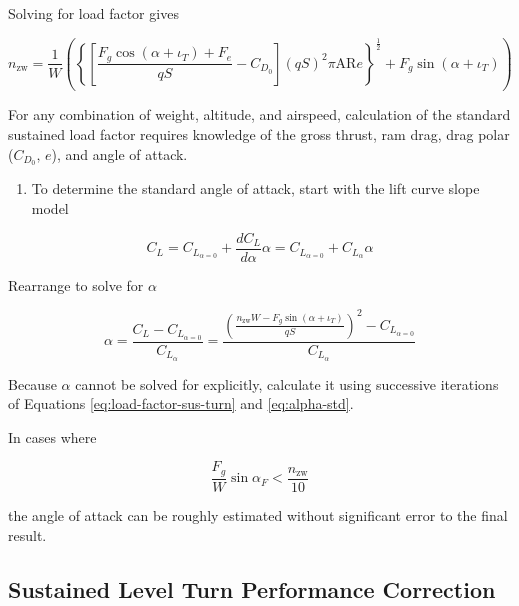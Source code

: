 \documentclass[
]{book}
\providecommand{\tightlist}{%
  \setlength{\itemsep}{0pt}\setlength{\parskip}{0pt}}
\begin{document}
Solving for load factor gives

\[
n_{\text{zw}} = \frac{1}{W}
      \left(
            \left\{
                  \left[
                        \frac{F_g \cos \left(\alpha + \iota_T \right)+F_e}
                             {qS} -
                        C_{D_0}
                  \right]
                  \left(
                        qS
                  \right)^2
                  \pi \mathrm{AR} e
            \right\}^{\frac{1}{2}} +
            F_g \sin \left(\alpha + \iota_T \right)
      \right)
\label{eq:load-factor-sus-turn}
\]

For any combination of weight, altitude, and airspeed, calculation of the
standard sustained load factor requires knowledge of the gross thrust, ram
drag, drag polar (\(C_{D_0},\,e\)), and angle of attack.

\begin{enumerate}
\def\labelenumi{\arabic{enumi}.}
\setcounter{enumi}{5}
\tightlist
\item
  To determine the standard angle of attack, start with the lift curve slope
  model
\end{enumerate}

\[
C_L = C_{L_{\alpha = 0}} + \frac{dC_L}{d\alpha} \alpha = C_{L_{\alpha = 0}} + C_{L_{\alpha}}\alpha
\]

Rearrange to solve for \(\alpha\)

\[
\alpha = \frac{C_L - C_{L_{\alpha = 0}}}{C_{L_{\alpha}}} =
      \frac{\left(
                  \frac{n_{\text{zw}}W - F_g \sin \left(\alpha + \iota_T \right)}
                       {qS}
            \right)^2 - C_{L_{\alpha = 0}}}
           {C_{L_{\alpha}}}
\label{eq:alpha-std}
\]

Because \(\alpha\) cannot be solved for explicitly, calculate it using
successive iterations of Equations \eqref{eq:load-factor-sus-turn} and \eqref{eq:alpha-std}.

In cases where

\[
\frac{F_g}{W} \sin \alpha_F \lt \frac{n_{\text{zw}}}{10}
\]

the angle of attack can be roughly estimated without significant error to the
final result.

\hypertarget{sustained-level-turn-performance-correction}{%
\subsection{Sustained Level Turn Performance Correction}\label{sustained-level-turn-performance-correction}}
\end{document}
